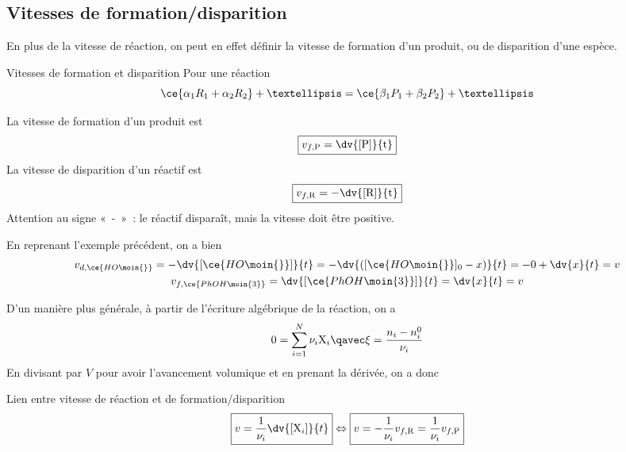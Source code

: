 \documentclass[../main/main.tex]{subfiles}
\begin{document}
\subsection{Vitesses de formation/disparition}

En plus de la vitesse de réaction, on peut en effet définir la vitesse de
formation d'un produit, ou de disparition d'une espèce.

\begin{defi}[label=def:vfordisp, heart]{Vitesses de formation et disparition}
    Pour une réaction
    \[\ce{\alpha_1R_1 + \alpha_2R_2} +…
            =
      \ce{\beta_1P_1 +\beta_2P_2}+…
    \]
    \begin{defiside}
        La vitesse de formation d'un produit est
        {
        \[\boxed{v_{f,\rm P} = \dv{[\rm P]}{t}}\]}
        \tcblower
        La vitesse de disparition d'un réactif est
        {
        \[\boxed{v_{f,\rm R} = -\dv{[\rm R]}{t}}\]}
        Attention au signe «~-~»~: le réactif disparaît, mais la vitesse doit
        être positive.
    \end{defiside}
\end{defi}

En reprenant l'exemple précédent, on a bien
\begin{gather*}
    v_{d,\ce{HO\moin{}}}
    = - \dv{[\ce{HO\moin{}}]}{t}
    = - \dv{([\ce{HO\moin{}}]_0 - x)}{t}
    = -0 + \dv{x}{t} = v\\
    v_{f,\ce{PhOH\moin{3}}}
    = \dv{[\ce{PhOH\moin{3}}]}{t}
    = \dv{x}{t} = v
\end{gather*}
    
D'un manière plus générale, à partir de l'écriture algébrique de la réaction, on
a
\[0 = \sum_{i=1}^{N} \nu_i {\rm X}_i \qavec \xi = \frac{n_i - n_i^0}{\nu_i}\]
En divisant par $V$ pour avoir l'avancement volumique et en prenant la dérivée,
on a donc

\begin{prop}[label=prop:vreacfordisp, hand]{Lien entre vitesse de réaction et de
    formation/disparition}
    {
    \[\boxed{v = \frac{1}{\nu_i} \dv{[{\rm X}_i]}{t}}
    \Leftrightarrow
    \boxed{v = -\frac{1}{\nu_i}v_{f,\rm R}
    =
    \frac{1}{\nu_i}v_{f,\rm P}}
    \]}\vspace{-12pt}
\end{prop}
\end{document}
